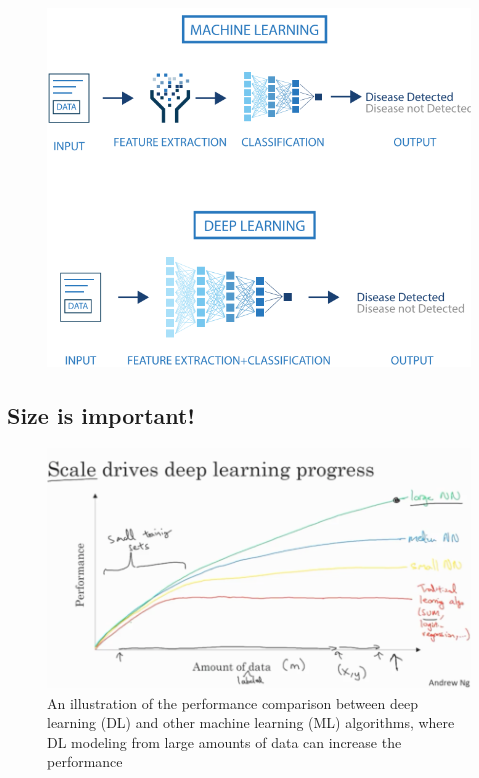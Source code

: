 \documentclass[
  letterpaper,
  DIV=11,
  numbers=noendperiod]{scrartcl}
\begin{document}
\begin{figure}[H]

{\centering \includegraphics[width=1\textwidth,height=\textheight]{images/ML_vs_DL-2.png}

}

\end{figure}

\hypertarget{size-is-important}{%
\subsection{Size is important!}\label{size-is-important}}

\begin{figure}

{\centering \includegraphics[width=1\textwidth,height=\textheight]{images/PerformanceVsAmountOfData.png}

}

\caption{An illustration of the performance comparison between deep
learning (DL) and other machine learning (ML) algorithms, where DL
modeling from large amounts of data can increase the performance}

\end{figure}
\end{document}
